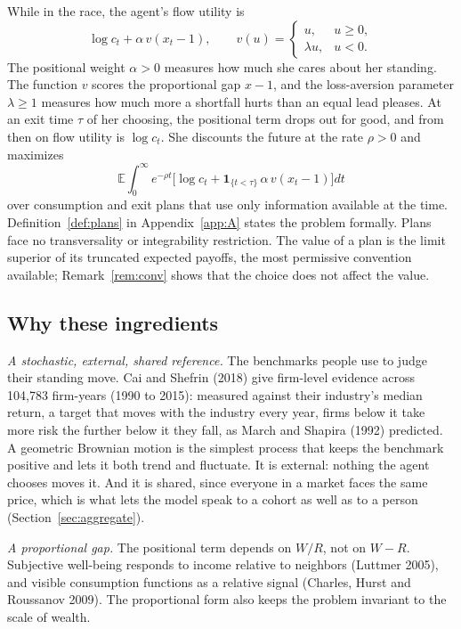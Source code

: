 \documentclass[12pt]{article}
\theoremstyle{definition}
\theoremstyle{remark}
\newcommand{\E}{\mathbb{E}}
\newcommand{\OAref}[1]{\ref{#1}}
\theoremstyle{plain}
\theoremstyle{definition}
\begin{document}
While in the race, the agent's flow utility is
\[
\log c_t+\alpha\,v(x_t-1),\qquad v(u)=\begin{cases}u,&u\ge0,\\ \lambda u,&u<0.\end{cases}
\]
The positional weight $\alpha>0$ measures how much she cares about her standing. The function $v$ scores the proportional gap $x-1$, and the loss-aversion parameter $\lambda\ge1$ measures how much more a shortfall hurts than an equal lead pleases. At an exit time $\tau$ of her choosing, the positional term drops out for good, and from then on flow utility is $\log c_t$. She discounts the future at the rate $\rho>0$ and maximizes
\begin{equation}
\E\int_0^\infty e^{-\rho t}\Big[\log c_t+\mathbf 1_{\{t<\tau\}}\,\alpha\,v(x_t-1)\Big]dt \label{eq:objective}
\end{equation}
over consumption and exit plans that use only information available at the time. Definition~\OAref{def:plans} in Appendix~\ref{app:A} states the problem formally. Plans face no transversality or integrability restriction. The value of a plan is the limit superior of its truncated expected payoffs, the most permissive convention available; Remark~\OAref{rem:conv} shows that the choice does not affect the value.

\subsection{Why these ingredients}

\emph{A stochastic, external, shared reference.} The benchmarks people use to judge their standing move. Cai and Shefrin (2018) give firm-level evidence across 104,783 firm-years (1990 to 2015): measured against their industry's median return, a target that moves with the industry every year, firms below it take more risk the further below it they fall, as March and Shapira (1992) predicted. A geometric Brownian motion is the simplest process that keeps the benchmark positive and lets it both trend and fluctuate. It is external: nothing the agent chooses moves it. And it is shared, since everyone in a market faces the same price, which is what lets the model speak to a cohort as well as to a person (Section~\ref{sec:aggregate}).

\emph{A proportional gap.} The positional term depends on $W/R$, not on $W-R$. Subjective well-being responds to income relative to neighbors (Luttmer 2005), and visible consumption functions as a relative signal (Charles, Hurst and Roussanov 2009). The proportional form also keeps the problem invariant to the scale of wealth.
\end{document}
